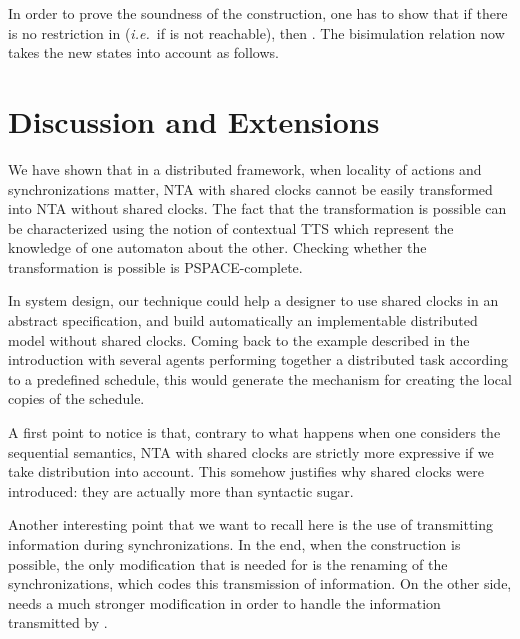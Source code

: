\documentclass{LMCS}
\theoremstyle{plain}\newtheorem*{prop11}{Proposition~\ref{prop:states} bis}
\def\ie{{\em i.e.\ }}
\begin{document}
In order to prove the soundness of the construction, one has to show that if
there is no restriction in  (\ie if  is not reachable),
then . The bisimulation relation now
takes the new states into account as follows.












\section{Discussion and Extensions}\label{sec:shared_clocks_ext}


We have shown that in a distributed framework, when locality of actions and
synchronizations matter, NTA with shared clocks cannot be easily transformed
into NTA without shared clocks. The fact that the transformation is possible can
be characterized using the notion of contextual TTS which represent the
knowledge of one automaton about the other. Checking whether the transformation
is possible is \textsf{PSPACE}-complete.

In system design, our technique could help a designer to use shared clocks in an
abstract specification, and build automatically an implementable distributed
model without shared clocks.
Coming back to the example described in the introduction with several agents
performing together a distributed task according to a predefined schedule, this
would generate the mechanism for creating the local copies of the schedule.

A first point to notice is that, contrary to what happens when one considers the
sequential semantics, NTA with shared clocks are strictly more expressive if we
take distribution into account. This somehow justifies why shared clocks were
introduced: they are actually more than syntactic sugar.

Another interesting point that we want to recall here is the use of
transmitting information during synchronizations. In the end, when the
construction is possible, the only modification that is needed for 
is the renaming of the synchronizations, which codes this transmission of
information. On the other side,  needs a much stronger modification in
order to handle the information transmitted by .
\end{document}
